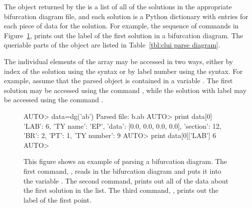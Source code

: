 \documentclass[12pt]{report}
\begin{document}
 The object returned by the  
 is a list of all of the solutions in the appropriate
 bifurcation diagram file, and each solution is a Python
 dictionary with entries for each piece of
 data for the solution.  For example, the sequence of commands
 in Figure~\ref{exa:clui parse diagram}, prints out the
 label of the first solution in a bifurcation diagram.
 The queriable parts of the object are listed in
 Table~\ref{tbl:clui parse diagram}.

 The individual elements of the array may be accessed 
 in two ways, either by index of the solution using the
 \commandf{[]} syntax or by label number using the
 \commandf{()} syntax.  For example, assume that the parsed object is contained
 in a variable .  
 The first solution may be accessed 
 using the command , while the solution with
 label  may be accessed using the command .

 \begin{figure}[htbp]
 {\small \begin{center} \begin{boxedverbatim}
 AUTO> data=dg('ab')
 Parsed file: b.ab
 AUTO> print data[0]
 {'LAB': 6, 'TY name': 'EP', 'data': [0.0, 0.0, 0.0, 0.0], 'section': 12, 
 'BR': 2, 'PT': 1, 'TY number': 9}
 AUTO> print data[0]['LAB']
 6
 AUTO> 
 \end{boxedverbatim}
 \end{center} 
 }
 \caption[An example of parsing a bifurcation diagram.]
 {This figure shows an example of parsing a bifurcation diagram.
 The first command, , reads in the bifurcation
 diagram and puts it into the variable .
 The second command,  prints out all of
 the data about the first solution in the list.
 The third command, , prints
 out the label of the first point.
 }
 \label{exa:clui parse diagram}
 \end{figure}
\end{document}
